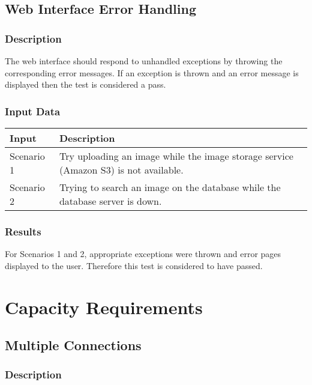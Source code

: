 \documentclass{scrreprt}
\begin{document}
\subsection{Web Interface Error Handling}
\subsubsection{Description}

The web interface should respond to unhandled exceptions by throwing the
corresponding error messages. If an exception is thrown and an error message is
displayed then the test is considered a pass.

\subsubsection{Input Data}

\begin{table}[H]
        \centering
        \begin{tabular}{p{3cm}p{6cm}}
                \hline\hline
                Input & Description\\
                \hline\hline
                Scenario 1 &  Try uploading an image while the image storage service (Amazon S3) is not available. \\
                \hline
                Scenario 2 & Trying to search an image on the database while the database server is down. \\
                \hline
        \end{tabular}
\end{table}

\subsubsection{Results}

For Scenarios 1 and 2, appropriate exceptions were thrown and error pages
displayed to the user. Therefore this test is considered to have passed.

\section{Capacity Requirements}

\subsection{Multiple Connections}
\subsubsection{Description}
\end{document}
